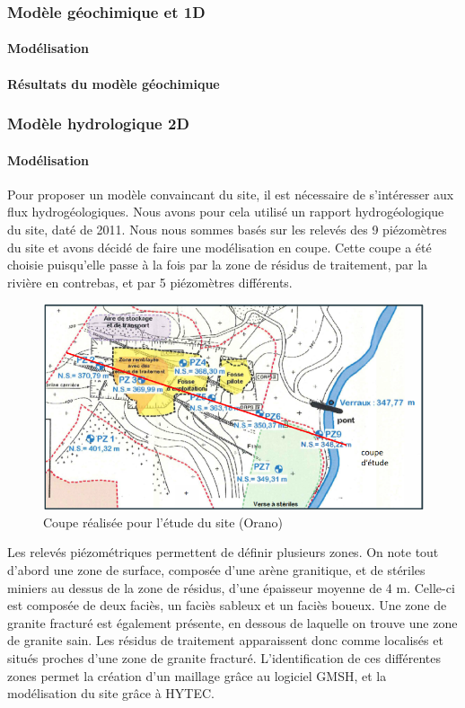 \documentclass{article}
\begin{document}
\subsubsection{Modèle géochimique et 1D}
\paragraph{Modélisation}


\paragraph{Résultats du modèle géochimique }

\subsubsection{Modèle hydrologique 2D}
\paragraph{Modélisation}

Pour proposer un modèle convaincant du site, il est nécessaire de s’intéresser aux flux hydrogéologiques. Nous avons pour cela utilisé un rapport hydrogéologique du site, daté de 2011. Nous nous sommes basés sur les relevés des 9 piézomètres du site et avons décidé de faire une modélisation en coupe. Cette coupe a été choisie puisqu’elle passe à la fois par la zone de résidus de traitement, par la rivière en contrebas, et par 5 piézomètres différents.

\begin{figure}[H]
    \centering
    \includegraphics[width=0.8\linewidth]{III_B_3_1.png}
    \caption{Coupe réalisée pour l'étude du site (Orano)}
    \label{fig:coupe_ribiere}
\end{figure}



Les relevés piézométriques permettent de définir plusieurs zones. On note tout d’abord une zone de surface, composée d’une arène granitique, et de stériles miniers au dessus de la zone de résidus, d’une épaisseur moyenne de 4 m. Celle-ci est composée de deux faciès, un faciès sableux et un faciès boueux. Une zone de granite fracturé est également présente, en dessous de laquelle on trouve une zone de granite sain. Les résidus de traitement apparaissent donc comme localisés et situés proches d’une zone de granite fracturé. L’identification de ces différentes zones permet la création d’un maillage grâce au logiciel GMSH, et la modélisation du site grâce à HYTEC.
\end{document}
